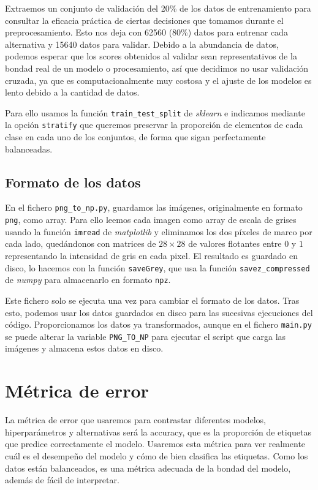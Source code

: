\documentclass[a4]{article}
\begin{document}
Extraemos un conjunto de validación del 20\% de los datos de
entrenamiento para consultar la eficacia práctica de ciertas
decisiones que tomamos durante el preprocesamiento. Esto nos deja con
62560 (80\%) datos para entrenar cada alternativa y 15640 datos para
validar. Debido a la abundancia de datos, podemos esperar que los
scores obtenidos al validar sean representativos de la bondad real de
un modelo o procesamiento, así que decidimos no usar validación
cruzada, ya que es computacionalmente muy costosa y el ajuste de los
modelos es lento debido a la cantidad de datos.

Para ello usamos la función \texttt{train\_test\_split} de
\textit{sklearn} e indicamos mediante la opción \texttt{stratify} que
queremos preservar la proporción de elementos de cada clase en cada
uno de los conjuntos, de forma que sigan perfectamente balanceadas.

\subsection{Formato de los datos}

En el fichero \texttt{png\_to\_np.py}, guardamos las imágenes,
originalmente en formato \texttt{png}, como array. Para ello leemos
cada imagen como array de escala de grises usando la función
\texttt{imread} de \textit{matplotlib} y eliminamos los dos píxeles de
marco por cada lado, quedándonos con matrices de $28 \times 28$ de
valores flotantes entre $0$ y $1$ representando la intensidad de gris
en cada pixel. El resultado es guardado en disco, lo hacemos con la
función \texttt{saveGrey}, que usa la función
\texttt{savez\_compressed} de \textit{numpy} para almacenarlo en
formato \texttt{npz}.

Este fichero solo se ejecuta una vez para cambiar el formato de los
datos. Tras esto, podemos usar los datos guardados en disco para las
sucesivas ejecuciones del código. Proporcionamos los datos ya
transformados, aunque en el fichero \texttt{main.py} se puede alterar
la variable \texttt{PNG\_TO\_NP} para ejecutar el script que carga las
imágenes y almacena estos datos en disco.

\section{Métrica de error}

La métrica de error que usaremos para contrastar diferentes modelos, hiperparámetros y alternativas será la accuracy, que es la proporción de etiquetas que predice correctamente el modelo. Usaremos esta métrica para ver realmente cuál es el desempeño del modelo y cómo de bien clasifica las etiquetas. Como los datos están balanceados, es una métrica adecuada de la bondad del modelo, además de fácil de interpretar.
\end{document}
